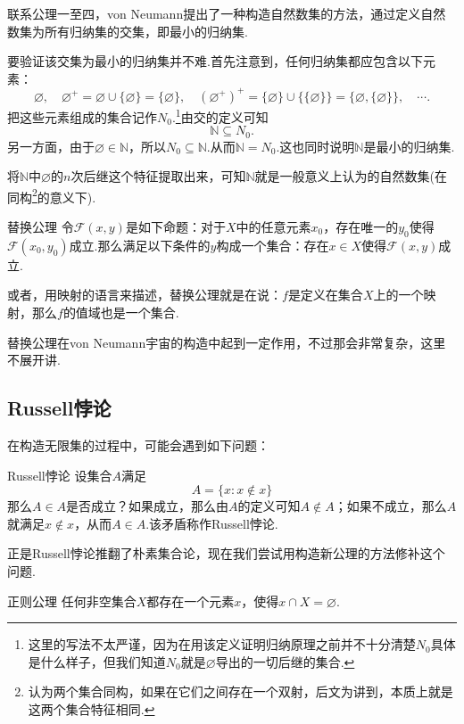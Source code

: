 联系公理一至四，von Neumann提出了一种构造自然数集的方法，通过定义自然数集为所有归纳集的交集，即最小的归纳集.

要验证该交集为最小的归纳集并不难.首先注意到，任何归纳集都应包含以下元素：$$\varnothing ,\quad \varnothing ^{+}=\varnothing \cup \{ \varnothing \}=\{ \varnothing \} ,\quad (\varnothing ^{+})^{+} = \{ \varnothing \} \cup \{ \{ \varnothing \} \} = \{ \varnothing , \{ \varnothing \}\} ,\quad \cdots .$$
把这些元素组成的集合记作$N_0$.\footnote{这里的写法不太严谨，因为在用该定义证明归纳原理之前并不十分清楚$N_0$具体是什么样子，但我们知道$N_0$就是$\varnothing$导出的一切后继的集合.}由交的定义可知$$\mathbb{N} \subseteq N_0.$$
另一方面，由于$\varnothing \in \mathbb{N}$，所以$N_0 \subseteq \mathbb{N}$.从而$\mathbb{N} = N_0$.这也同时说明$\mathbb{N}$是最小的归纳集.

将$\mathbb{N}$中$\varnothing$的$n$次后继这个特征提取出来，可知$\mathbb{N}$就是一般意义上认为的自然数集(在同构\footnote{认为两个集合同构，如果在它们之间存在一个双射，后文为讲到，本质上就是这两个集合特征相同.}的意义下).

\begin{axiom}{替换公理}
	令$\mathcal{F}(x,y)$是如下命题：对于$X$中的任意元素$x_0$，存在唯一的$y_0$使得$\mathcal{F}(x_0,y_0)$成立.那么满足以下条件的$y$构成一个集合：存在$x \in X$使得$\mathcal{F}(x,y)$成立.
\end{axiom}

或者，用映射的语言来描述，替换公理就是在说：$f$是定义在集合$X$上的一个映射，那么$f$的值域也是一个集合.

替换公理在von Neumann宇宙的构造中起到一定作用，不过那会非常复杂，这里不展开讲.

\subsection{Russell悖论}

在构造无限集的过程中，可能会遇到如下问题：

\begin{definition}{Russell悖论}
	设集合$A$满足$$A = \{ x:x \notin x \}$$
	那么$A \in A$是否成立？如果成立，那么由$A$的定义可知$A \notin A$；如果不成立，那么$A$就满足$x \notin x$，从而$A \in A$.该矛盾称作Russell悖论.
\end{definition}

正是Russell悖论推翻了朴素集合论，现在我们尝试用构造新公理的方法修补这个问题.

\begin{axiom}{正则公理}
	任何非空集合$X$都存在一个元素$x$，使得$x \cap X = \varnothing$.
\end{axiom}

